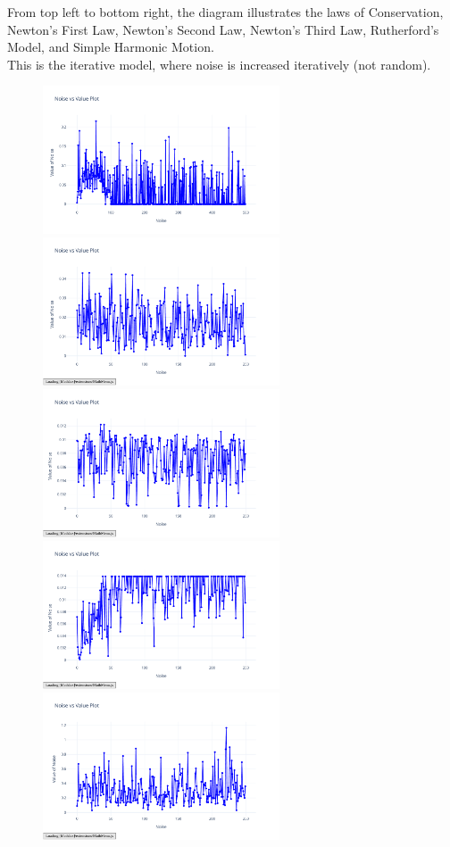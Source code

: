 \documentclass{article}
\begin{document}
From top left to bottom right, the diagram illustrates the laws of Conservation, Newton's First Law, Newton's Second Law, Newton's Third Law, Rutherford's Model, and Simple Harmonic Motion.\\
This is the iterative model, where noise is increased iteratively (not random).\\ 


\begin{figure}[H]
    \centering
    \includegraphics[width=7cm]{noise_conservation_d_i}
    \includegraphics[width=7cm]{noise_Newtons_First_Law_d_i}
    \includegraphics[width=7cm]{noise_Newtons_Second_Law_d_i}
    \includegraphics[width=7cm]{noise_Newtons_Third_Law_d_i}
    \includegraphics[width=7cm]{noise_Rutherford_d_i}

\end{figure}
\end{document}
